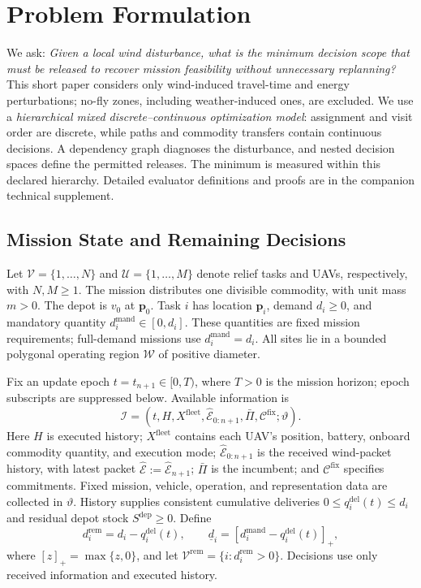 \section{Problem Formulation}
\label{sec:problem_formulation}

We ask: \emph{Given a local wind disturbance, what is the minimum decision
scope that must be released to recover mission feasibility without
unnecessary replanning?} This short paper considers only wind-induced
travel-time and energy perturbations; no-fly zones, including
weather-induced ones, are excluded.
We use a \emph{hierarchical mixed
discrete--continuous optimization model}: assignment and visit order are
discrete, while paths and commodity transfers contain continuous decisions.
A dependency graph diagnoses the disturbance, and nested decision spaces
define the permitted releases. The minimum is measured within this declared
hierarchy. Detailed evaluator definitions and proofs are in the companion
technical supplement.

\subsection{Mission State and Remaining Decisions}
\label{subsec:information_remaining}

Let $\mathcal V=\{1,\ldots,N\}$ and $\mathcal U=\{1,\ldots,M\}$ denote
relief tasks and UAVs, respectively, with $N,M\ge1$.
The mission distributes one divisible commodity, with unit mass $m>0$.
The depot is $v_0$ at $\mathbf p_0$.
Task $i$ has location $\mathbf p_i$, demand $d_i\ge0$,
and mandatory quantity $d_i^{\mathrm{mand}}\in[0,d_i]$.
These quantities are fixed mission requirements; full-demand missions use
$d_i^{\mathrm{mand}}=d_i$.
All sites lie in a bounded polygonal operating region $\mathcal W$ of
positive diameter.

Fix an update epoch $t=t_{n+1}\in[0,T)$, where $T>0$ is the mission
horizon; epoch subscripts are suppressed below. Available information is
\begin{equation}
\mathscr I=(t,H,X^{\mathrm{fleet}},\widehat{\mathcal E}_{0:n+1},
\bar\Pi,\mathcal C^{\mathrm{fix}};\vartheta).
\label{eq:information_state}
\end{equation}
Here $H$ is executed history; $X^{\mathrm{fleet}}$ contains each UAV's
position, battery, onboard commodity quantity, and execution mode;
$\widehat{\mathcal E}_{0:n+1}$ is the received wind-packet history, with latest
packet $\widehat{\mathcal E}:=\widehat{\mathcal E}_{n+1}$;
$\bar\Pi$ is the incumbent;
and $\mathcal C^{\mathrm{fix}}$ specifies commitments. Fixed mission,
vehicle, operation, and representation data are collected in $\vartheta$.
History supplies consistent cumulative deliveries
$0\le q_i^{\mathrm{del}}(t)\le d_i$ and residual depot stock
$S^{\mathrm{dep}}\ge0$. Define
\begin{equation}
d_i^{\mathrm{rem}}=d_i-q_i^{\mathrm{del}}(t),\qquad
\underline d_i=[d_i^{\mathrm{mand}}-q_i^{\mathrm{del}}(t)]_+,
\label{eq:residual_requirements}
\end{equation}
where $[z]_+=\max\{z,0\}$, and let
$\mathcal V^{\mathrm{rem}}=\{i:d_i^{\mathrm{rem}}>0\}$.
Decisions use only received information and executed history.

